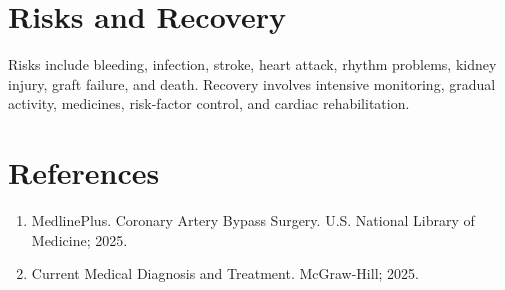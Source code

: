\section*{Risks and Recovery}
Risks include bleeding, infection, stroke, heart attack, rhythm problems, kidney injury, graft failure, and death. Recovery involves intensive monitoring, gradual activity, medicines, risk-factor control, and cardiac rehabilitation.

\section*{References}
\begin{enumerate}
  \item MedlinePlus. Coronary Artery Bypass Surgery. U.S. National Library of Medicine; 2025.
  \item Current Medical Diagnosis and Treatment. McGraw-Hill; 2025.
\end{enumerate}
\clearpage
